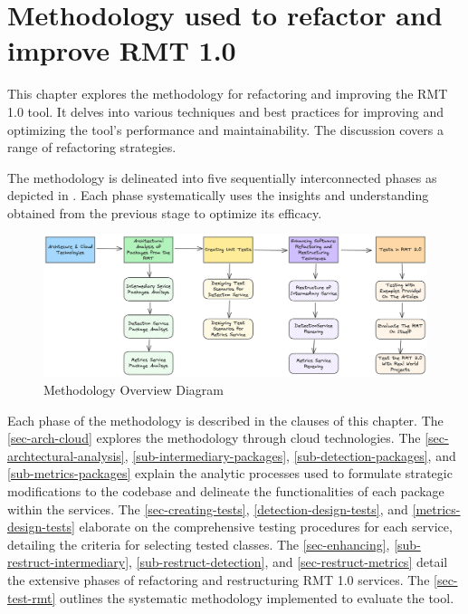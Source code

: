 \chapter{Methodology used to refactor and improve RMT 1.0}%
\label{methodology}

This chapter explores the methodology for refactoring and improving the RMT 1.0 tool. It delves into various techniques and best practices for improving and optimizing the tool's performance and maintainability. The discussion covers a range of refactoring strategies.

The methodology is delineated into five sequentially interconnected phases as depicted in . Each phase systematically uses the insights and understanding obtained from the previous stage to optimize its efficacy. 

\begin{figure}[ht!]
\SetCaptionWidth{\textwidth}
\caption{Methodology Overview Diagram}
\label{fig-overview-methodology}
\includegraphics[width =\textwidth]{Chapter-4/Figures/Metodologia.png}
\end{figure}
\FloatBarrier


Each phase of the methodology is described in the clauses of this chapter. The \cref{sec-arch-cloud} explores the methodology through cloud technologies. The \cref{sec-archtectural-analysis}, \ref{sub-intermediary-packages}, \ref{sub-detection-packages}, and \ref{sub-metrics-packages} explain the analytic processes used to formulate strategic modifications to the codebase and delineate the functionalities of each package within the services. The \cref{sec-creating-tests}, \ref{detection-design-tests}, and \ref{metrics-design-tests} elaborate on the comprehensive testing procedures for each service, detailing the criteria for selecting tested classes. The \cref{sec-enhancing}, \ref{sub-restruct-intermediary}, \ref{sub-restruct-detection}, and \ref{sec-restruct-metrics} detail the extensive phases of refactoring and restructuring RMT 1.0 services. The \cref{sec-test-rmt} outlines the systematic methodology implemented to evaluate the tool.

